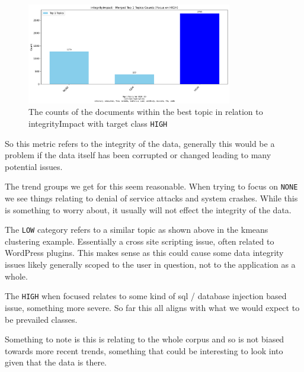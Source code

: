 \documentclass[12pt]{article}
\begin{document}
\begin{figure}[h] \centering
	\includegraphics[width=0.8\textwidth]{figures/integrityImpact/merged_top_k_topics_category_focus_counts_integrityImpact_HIGH_k1.png}
	\caption{\label{fig:integrityImpact_20_HIGH}The counts of the documents within the best topic in
		relation to integrityImpact with target class \texttt{HIGH}}
\end{figure}

So this metric refers to the integrity of the data, generally this would be a problem if the data
itself has been corrupted or changed leading to many potential issues.

The trend groups we get for this seem reasonable. When trying to focus on \texttt{NONE} we see things relating
to denial of service attacks and system crashes. While this is something to worry about, it usually
will not effect the integrity of the data.

The \texttt{LOW} category refers to a similar topic as shown above in the kmeans clustering example.
Essentially a cross site scripting issue, often related to WordPress plugins. This makes sense as
this could cause some data integrity issues likely generally scoped to the user in question, not to
the application as a whole.

The \texttt{HIGH} when focused relates to some kind of sql / database injection based issue,
something more severe. So far this all aligns with what we would expect to be prevailed classes.

Something to note is this is relating to the whole corpus and so is not biased towards more recent
trends, something that could be interesting to look into given that the data is there.


\end{document}
